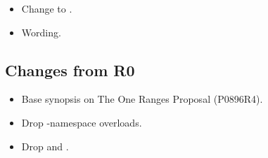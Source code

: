 \begin{itemize}
  \item Change  to .
  \item Wording.
\end{itemize}

\subsection{Changes from R0}

\begin{itemize}
  \item Base synopsis on The One Ranges Proposal (P0896R4).
  \item Drop -namespace overloads.
  \item Drop  and .
\end{itemize}
